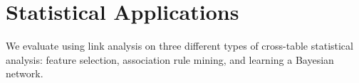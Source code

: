\documentclass{sig-alternate-2013}
\begin{document}

\section{Statistical Applications}
We evaluate using link analysis on three different types of cross-table statistical analysis: feature selection, association rule  mining, and learning a Bayesian network.
\end{document}
